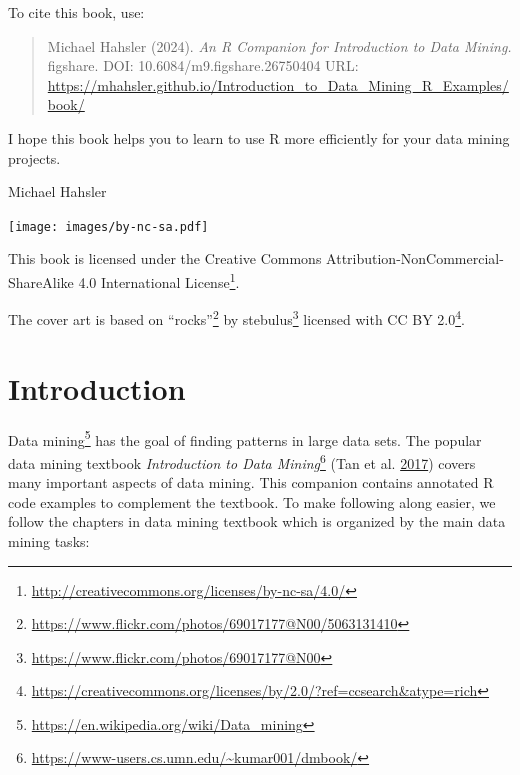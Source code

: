 \documentclass[
  notitlepage]{book}
\DeclareRobustCommand{\href}[2]{#2\footnote{\url{#1}}}
\begin{document}
\newpage

To cite this book, use:

\begin{quote}
Michael Hahsler (2024). \emph{An R Companion for Introduction to Data
Mining.} figshare.
DOI: 10.6084/m9.figshare.26750404
URL: \url{https://mhahsler.github.io/Introduction_to_Data_Mining_R_Examples/book/}
\end{quote}

I hope this book helps you to learn to use R more efficiently for your
data mining projects.

Michael Hahsler

\vfill

\texttt{[image: images/by-nc-sa.pdf]}~

This book is licensed under the \href{http://creativecommons.org/licenses/by-nc-sa/4.0/}{Creative Commons
Attribution-NonCommercial-ShareAlike 4.0 International
License}.

The cover art is based on
\href{https://www.flickr.com/photos/69017177@N00/5063131410}{``rocks''} by
\href{https://www.flickr.com/photos/69017177@N00}{stebulus} licensed with \href{https://creativecommons.org/licenses/by/2.0/?ref=ccsearch\&atype=rich}{CC
BY
2.0}.

\hypertarget{introduction}{%
\chapter{Introduction}\label{introduction}}

\href{https://en.wikipedia.org/wiki/Data_mining}{Data mining} has the goal of
finding patterns in large data sets. The popular data mining textbook
\href{https://www-users.cs.umn.edu/~kumar001/dmbook/}{\emph{Introduction to Data
Mining}} (Tan et al. \protect\hyperlink{ref-Tan2018}{2017})
covers many important aspects of data mining. This companion contains
annotated R code examples to complement the textbook. To make following
along easier, we follow the chapters in data mining textbook which is
organized by the main data mining tasks:
\end{document}
